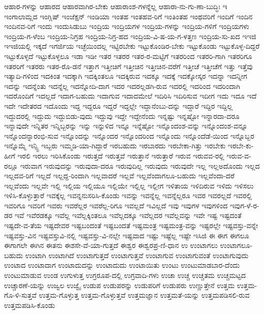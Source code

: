 {ಆಹಾರ-ಗಳನ್ನು
ಆಹಾರದ
ಆಹಾರವಾಗಿರ-ಬೇಕು
ಆಹಾರಾಂಶ-ಗಳನ್ನೆಲ್ಲ
ಆಹಾರಾ-ನು-ಗು-ಣಾ-ಬುದ್ಧಿಃ
ಇ
ಇಂಗಾಲಾಮ್ಲದ
ಇಂಗ್ಲಿಷ್
ಇಂಜೆಕ್ಷನ್
ಇಂಡಿಯಾ
ಇಂತಹ
ಇಂತಹವ-ರಿಗೆ
ಇಂತಿಂತಹ
ಇಂಥವರಿಗೆ
ಇಂದಿಗೆ
ಇಂದಿನ
ಇಂದಿನವ-ರಿಗೆ
ಇಂದು
ಇಂದುಸಿಡುಬು
ಇಂದ್ರಿಯ
ಇಂದ್ರಿಯಗಳ
ಇಂದ್ರಿಯ-ಗಳನ್ನು
ಇಂದ್ರಿಯ-ಗಳಿಗೆ
ಇಂದ್ರಿಯಗಳು
ಇಂದ್ರಿಯ-ಗ-ಳೆಂಬ
ಇಂದ್ರಿಯ-ನಿಗ್ರಹ
ಇಂದ್ರಿಯ-ನಿಗ್ರ-ಹದ
ಇಂದ್ರಿಯ-ವಿ-ಷ-ಯ-ಗ-ಳತ್ತಣ
ಇಂದ್ರಿಯ-ಸು-ಖದ
ಇಇಜಿ
ಇಇಜಿಯಲ್ಲಿ
ಇಕ್ಕದೆ
ಇಗರ್ಜಿಯ
ಇಚ್ಛೆಯಿಂದಲ್ಲ
ಇಟ್ಟಿರಬೇಕು
ಇಟ್ಟುಕೊಂಡಿರ-ಬೇಕು
ಇಟ್ಟುಕೊಂಡು
ಇಟ್ಟುಕೊಳ್ಳ-ದಿದ್ದರೆ
ಇಟ್ಟುಕೊಳ್ಳದೆ
ಇಟ್ಟುಕೊಳ್ಳಲೂ
ಇಡಾ
ಇಡೀ
ಇತರ
ಇತರರ
ಇತರ-ರ-ಮಟ್ಟಿಗೆ
ಇತರರಿಂದ
ಇತರರಿ-ಗಾಗಿ
ಇತರರಿಗೂ
ಇತರರಿಗೆ
ಇತರರು
ಇತರ-ರೊ-ಡನೆ
ಇತ್ತಾಗ
ಇತ್ತೀಚಿಗೆ
ಇತ್ತೀಚಿನ
ಇತ್ತೀಚಿನ-ವರೆಗೆ
ಇತ್ತೀಚೆ
ಇತ್ತೀಚೆಗೆ
ಇತ್ತು
ಇತ್ತೆವು
ಇತ್ಯಾದಿ-ಗಳಿಂದ
ಇದಕಿಂತ
ಇದಕ್ಕಾಗಿ
ಇದಕ್ಕಿಂತಲೂ
ಇದಕ್ಕಿರುವ
ಇದಕ್ಕೂ
ಇದಕ್ಕೆ
ಇದಕ್ಕೋಸ್ಕರ
ಇದನ್ನಾ
ಇದನ್ನೀಗ
ಇದನ್ನು
ಇದನ್ನೆಂತು
ಇದನ್ನೆಲ್ಲ
ಇದನ್ನೋದಿ-ದಾಗ
ಇದರ
ಇದರಲ್ಲಡಗಿ-ರುವ
ಇದರಲ್ಲಿ
ಇದರಿಂದ
ಇದರಿಂದಾಗಿ
ಇದರೊಂದಿಗೆ
ಇದಲ್ಲದೆ
ಇದಾಗ-ಬಹುದು
ಇದಾಗುವ
ಇದಾದಮೇಲೆ
ಇದಿರಿಸಿ
ಇದಿರಿಸುವ
ಇದೀಗ
ಇದು
ಇದೂ
ಇದೆ
ಇದೇ
ಇದೇತರದ
ಇದೊಂದು
ಇದ್ದ
ಇದ್ದರೂ
ಇದ್ದರೆ
ಇದ್ದಲ್ಲೇ
ಇದ್ದಾನೆಂಬು-ದನ್ನು
ಇದ್ದಾರೆ
ಇದ್ದಿರ
ಇದ್ದಿಲ್ಲ
ಇದ್ದುದರಲ್ಲಿ
ಇದ್ದುದು
ಇದ್ದುಬಿಡು-ವುದು
ಇದ್ದುವು
ಇದ್ದೇ
ಇದ್ದೇನೆಂದು
ಇನ್ನಷ್ಟು
ಇನ್ನಷ್ಟೋ
ಇನ್ನಾರದಾ-ದರೂ
ಇನ್ನಾವುದೇ
ಇನ್ನಿತರ
ಇನ್ನಿಬ್ಬರನ್ನು
ಇನ್ನು
ಇನ್ನುಳಿದ
ಇನ್ನೂ
ಇನ್ನೆಷ್ಟೋ
ಇನ್ನೊಂದಂಶ-ವನ್ನು
ಇನ್ನೊಂದಂಶ-ವನ್ನೂ
ಇನ್ನೊಂದನ್ನಾರಂಭಿ-ಸುವ
ಇನ್ನೊಂದನ್ನು
ಇನ್ನೊಂದರ
ಇನ್ನೊಂದರಿಂದ
ಇನ್ನೊಂದು
ಇನ್ನೊಂದೆಡೆ-ಯಿಂದ
ಇನ್ನೊಬ್ಬರ
ಇನ್ನೊಮ್ಮೆ
ಇನ್ಸ್ಟಿ
ಇಬ್ಬರು
ಇಮ್ಮಡಿ-ಯಾ-ಗಿದ್ದಾರೆ
ಇರಬಹುದು
ಇರಬಾರದು
ಇರಬೇಕಾ-ಗಿತ್ತು
ಇರಬೇಕು
ಇರಬೇ-ಕು-ಹೀಗೆ
ಇರಲಿ
ಇರಲು
ಇರಿಸಿಕೊಂಡು
ಇರುತ್ತದೆ
ಇರುತ್ತವೆ
ಇರುತ್ತಾನೆ
ಇರುತ್ತಾರೆ
ಇರುವ
ಇರುವವ-ರಲ್ಲಿ
ಇರುವ-ವ-ರಲ್ಲೂ
ಇರುವಾಗ
ಇರುವುದನ್ನು
ಇರುವುದಾ-ದರೂ
ಇರುವುದಿಲ್ಲ
ಇರುವುದು
ಇರುವುದೇ
ಇಲ್ಲ
ಇಲ್ಲಅದೊಂದು
ಇಲ್ಲದ
ಇಲ್ಲದವ-ರಿಗೆ
ಇಲ್ಲದೆ
ಇಲ್ಲದ್ದ-ರಿಂದಾಗಿ
ಇಲ್ಲವಾದರೆ
ಇಲ್ಲವೆ
ಇಲ್ಲವೆಂದಾಗಲೂ-ಬಹುದು
ಇಲ್ಲವೆಂದಾ-ದರೆ
ಇಲ್ಲವೆಂದು
ಇಲ್ಲವೇ
ಇಲ್ಲಿ
ಇಲ್ಲಿಯ
ಇಲ್ಲಿಯೂ
ಇಲ್ಲಿಯೇ
ಇಲ್ಲಿಲ್ಲ
ಇಲ್ಲೀಗ
ಇಳಿತಾಯ
ಇಳಿದಿರುವ
ಇಳಿದು
ಇಳಿಸಲು
ಇಳಿಸಿ-ಕೊಳ್ಳುತ್ತಾರೆ
ಇವಕ್ಕೆಲ್ಲ
ಇವನ್ನನುಸರಿಸಿ-ಕೊಂಡು
ಇವನ್ನು
ಇವನ್ನೆಲ್ಲ
ಇವನ್ನೆಲ್ಲರೂ
ಇವರ
ಇವರಲ್ಲದೆ
ಇವರಲ್ಲಿ
ಇವರಿಗೂ
ಇವರಿಗೆ
ಇವರು
ಇವರೆಲ್ಲರ
ಇವರೆಲ್ಲ-ರಿಗೂ
ಇವಲ್ಲದೆ
ಇವಿಲ್ಲದೆ
ಇವು
ಇವುಗಳ
ಇವುಗಳಿಂದ
ಇವುಗ-ಳೆ-ರ-ಡರ
ಇವೆ
ಇವೆರಡಕ್ಕೂ
ಇವೆಲ್ಲ
ಇವೆಲ್ಲಕ್ಕಿಂತಲೂ
ಇವೆಲ್ಲದಕ್ಕೂ
ಇವೆಲ್ಲದರ
ಇವೆಲ್ಲವನ್ನು
ಇವೇ
ಇಷ್ಟ
ಇಷ್ಟದಂತೆ
ಇಷ್ಟದೇ-ವ-ತೆಯ
ಇಷ್ಟದೇವರ
ಇಷ್ಟಬಂದಂತೆ
ಇಷ್ಟಬಂದತೆ
ಇಷ್ಟಮಂತ್ರ
ಇಷ್ಟಮಂತ್ರ-ವನ್ನು
ಇಷ್ಟರಲ್ಲೇ
ಇಷ್ಟವಸ್ತು-ವನ್ನೇ
ಇಷ್ಟವಸ್ತು-ವಿನ
ಇಷ್ಟವಸ್ತುವಿ-ನಲ್ಲಿ
ಇಷ್ಟವಸ್ತು-ವಿ-ನಲ್ಲೇ
ಇಷ್ಟವಾದ
ಇಷ್ಟು
ಇಷ್ಟೆಲ್ಲ
ಇಷ್ಟೇ
ಇಸಿಜಿ
ಈ
ಈಗ
ಈಗಲೂ
ಈಗಾಗಲೇ
ಈಗಿನ
ಈತನು
ಈಶಸೇ-ವೆ-ಯಾ-ಗುತ್ತದೆ
ಈಶ್ವರ
ಈಶ್ವರಪ್ರ-ಣಿ-ಧಾನ
ಉ
ಉಂಟಾಗಲು
ಉಂಟಾಗಲೂ-ಬಹುದು
ಉಂಟಾಗಿ
ಉಂಟಾಗಿದೆ
ಉಂಟಾಗುತ್ತದೆ
ಉಂಟಾಗುತ್ತವೆ
ಉಂಟಾಗುವ
ಉಂಟಾಗುವಂತೆ
ಉಂಟಾಗುವುದು
ಉಂಟಾದ
ಉಂಟಾದಾಗ
ಉಂಟಾದುದನ್ನು
ಉಂಟಾದುದು
ಉಂಟಾಯಿತು
ಉಂಟು
ಉಂಟುಮಾಡಬಾರ-ದೆಂದು
ಉಂಟುಮಾಡುವ
ಉಂಡ
ಉಗುಳುತ್ತ
ಉಗ್ರರೂಪ-ದಲ್ಲಿ
ಉಗ್ರವಾದಿ-ಗಳು
ಉಚಾ
ಉಚ್ಚ
ಉಚ್ಚತಮ
ಉಚ್ಚಮಟ್ಟದ
ಉಚ್ಚಾರಣೆ-ಯನ್ನು
ಉಜ್ವಲ
ಉಜ್ವೈ
ಉಡುಪ
ಉಡುಪರನ್ನು
ಉಡುಪರಿಗೆ
ಉಡುಪರು
ಉಣ್ಣುತ್ತೇನೆ
ಉತ್ತಮ
ಉತ್ತಮ-ಗೊ-ಳಿ-ಸುತ್ತವೆ
ಉತ್ತಮ-ಗೊಳ್ಳುತ್ತ
ಉತ್ತಮ-ಗೊಳ್ಳುತ್ತವೆ
ಉತ್ತಮಜ್ಞಾನ
ಉತ್ತಮತೆ-ಯನ್ನು
ಉತ್ತಮಪಡಿಸಲಿ-ರುವ
ಉತ್ತಮಪಡಿಸಿ-ಕೊಂಡು
}
